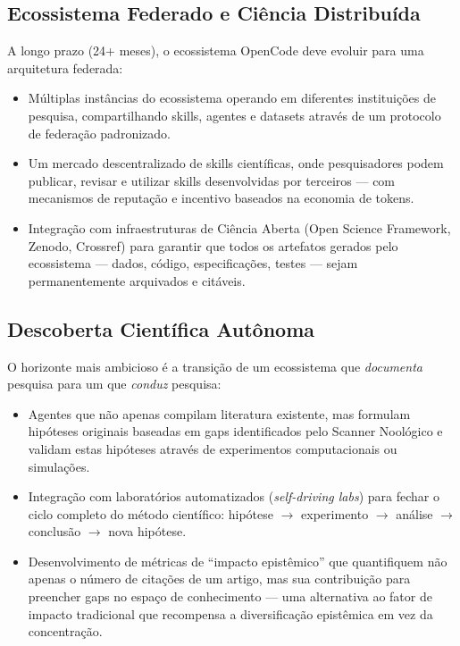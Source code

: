 \subsection{Ecossistema Federado e Ciência Distribuída}

A longo prazo (24+ meses), o ecossistema OpenCode deve evoluir para uma arquitetura federada:

\begin{itemize}
  \item Múltiplas instâncias do ecossistema operando em diferentes instituições de pesquisa, compartilhando skills, agentes e datasets através de um protocolo de federação padronizado.
  \item Um mercado descentralizado de skills científicas, onde pesquisadores podem publicar, revisar e utilizar skills desenvolvidas por terceiros --- com mecanismos de reputação e incentivo baseados na economia de tokens.
  \item Integração com infraestruturas de Ciência Aberta (Open Science Framework, Zenodo, Crossref) para garantir que todos os artefatos gerados pelo ecossistema --- dados, código, especificações, testes --- sejam permanentemente arquivados e citáveis.
\end{itemize}

\subsection{Descoberta Científica Autônoma}

O horizonte mais ambicioso é a transição de um ecossistema que \textit{documenta} pesquisa para um que \textit{conduz} pesquisa:

\begin{itemize}
  \item Agentes que não apenas compilam literatura existente, mas formulam hipóteses originais baseadas em gaps identificados pelo Scanner Noológico e validam estas hipóteses através de experimentos computacionais ou simulações.
  \item Integração com laboratórios automatizados (\textit{self-driving labs}) para fechar o ciclo completo do método científico: hipótese $\rightarrow$ experimento $\rightarrow$ análise $\rightarrow$ conclusão $\rightarrow$ nova hipótese.
  \item Desenvolvimento de métricas de ``impacto epistêmico'' que quantifiquem não apenas o número de citações de um artigo, mas sua contribuição para preencher gaps no espaço de conhecimento --- uma alternativa ao fator de impacto tradicional que recompensa a diversificação epistêmica em vez da concentração.
\end{itemize}

